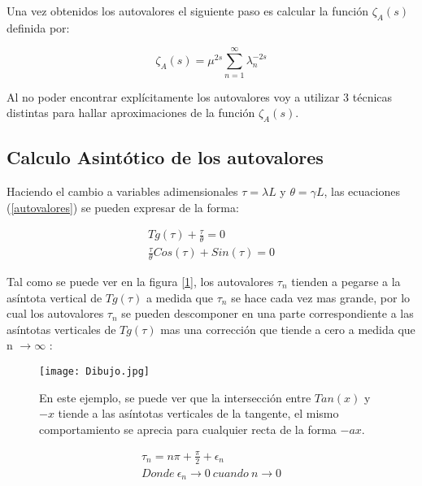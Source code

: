 Una vez obtenidos los autovalores el siguiente paso es calcular la función $\zeta _A (s) $ definida por:

\begin{equation}
    \zeta _ {A } (s) = \mu ^{2s} \sum_{n = 1} ^{ \infty } \lambda _n ^ {-2 s}
\end{equation}

Al no poder encontrar explícitamente los autovalores voy a utilizar 3 técnicas distintas para hallar aproximaciones de la función $\zeta _A (s)$.

\subsection{Calculo Asintótico de los autovalores}


Haciendo el cambio a variables adimensionales $\tau = \lambda L $ y $\theta = \gamma L $, las ecuaciones (\ref{autovalores}) se pueden expresar de la forma:

\begin{equation}
\begin{array}{c}
    Tg(\tau) + \frac{\tau}{\theta} = 0 \\
    \frac{\tau}{\theta} Cos( \tau ) + Sin( \tau ) = 0
\end{array}
\label{eq.asintota}
\end{equation}

Tal como se puede ver en la figura [\ref{fig:Dibujo1}], los autovalores $\tau _n$ tienden a pegarse a la asíntota vertical de $ Tg ( \tau ) $ a medida que $\tau _n$ se hace cada vez mas grande, por lo cual los autovalores $\tau _n$ se pueden descomponer en una parte correspondiente a las asíntotas verticales de $Tg( \tau )$ mas una corrección que tiende a cero a medida que n  $ \rightarrow \infty$ :

\begin{figure}
    \centering
    \texttt{[image: Dibujo.jpg]}
    \caption{En este ejemplo, se puede ver que la intersección entre $Tan(x)$ y $-x$ tiende a las asíntotas verticales de la tangente, el mismo comportamiento se aprecia para cualquier recta de la forma $- a x$.}
    \label{fig:Dibujo1}
\end{figure}

\begin{equation}
\begin{array}{c}
    \tau _n = n \pi + \frac{\pi}{2} + \epsilon _n \\
    Donde \ \epsilon _n \rightarrow{0}  \ cuando \ n \rightarrow{0}
\end{array}
\label{eq.mu}
\end{equation}


